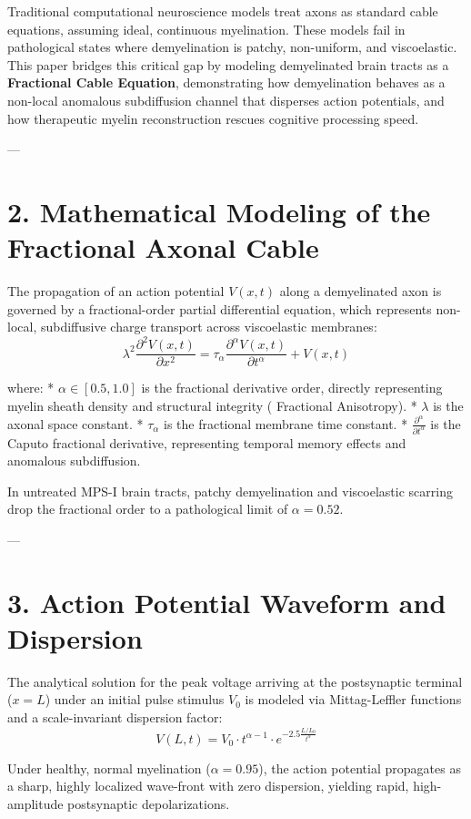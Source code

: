 \documentclass[11pt,twocolumn]{article}
\begin{document}
Traditional computational neuroscience models treat axons as standard cable equations, assuming ideal, continuous myelination. These models fail in pathological states where demyelination is patchy, non-uniform, and viscoelastic. This paper bridges this critical gap by modeling demyelinated brain tracts as a \textbf{Fractional Cable Equation}, demonstrating how demyelination behaves as a non-local anomalous subdiffusion channel that disperses action potentials, and how therapeutic myelin reconstruction rescues cognitive processing speed.

---

\section{2. Mathematical Modeling of the Fractional Axonal Cable}
The propagation of an action potential $V(x,t)$ along a demyelinated axon is governed by a fractional-order partial differential equation, which represents non-local, subdiffusive charge transport across viscoelastic membranes:
$$\lambda^2 \frac{\partial^2 V(x,t)}{\partial x^2} = \tau_{\alpha} \frac{\partial^{\alpha} V(x,t)}{\partial t^{\alpha}} + V(x,t)$$

where:
*   $\alpha \in [0.5, 1.0]$ is the fractional derivative order, directly representing myelin sheath density and structural integrity ( Fractional Anisotropy).
*   $\lambda$ is the axonal space constant.
*   $\tau_{\alpha}$ is the fractional membrane time constant.
*   $\frac{\partial^{\alpha}}{\partial t^{\alpha}}$ is the Caputo fractional derivative, representing temporal memory effects and anomalous subdiffusion.

In untreated MPS-I brain tracts, patchy demyelination and viscoelastic scarring drop the fractional order to a pathological limit of $\alpha = 0.52$.

---

\section{3. Action Potential Waveform and Dispersion}
The analytical solution for the peak voltage arriving at the postsynaptic terminal ($x = L$) under an initial pulse stimulus $V_0$ is modeled via Mittag-Leffler functions and a scale-invariant dispersion factor:
$$V(L, t) = V_0 \cdot t^{\alpha - 1} \cdot e^{-2.5 \frac{L / L_0}{t^{\alpha}}}$$

Under healthy, normal myelination ($\alpha = 0.95$), the action potential propagates as a sharp, highly localized wave-front with zero dispersion, yielding rapid, high-amplitude postsynaptic depolarizations. 
\end{document}
